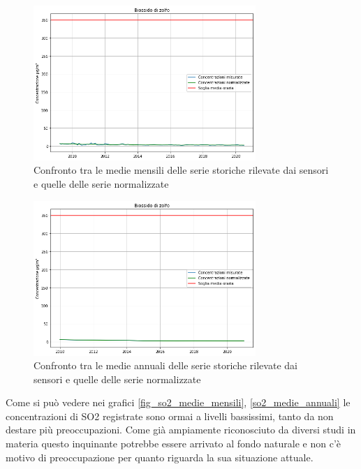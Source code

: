 \documentclass[a4paper]{report}
\begin{document}
\begin{figure}[h]
\centering
\includegraphics[width=0.75\textwidth]{so2_medie_mensili}
\caption{Confronto tra le medie mensili delle serie storiche rilevate dai sensori e quelle delle serie normalizzate}
\label{fig:so2_medie_mensili}
\end{figure}

\begin{figure}[h]
\centering
\includegraphics[width=0.75\textwidth]{so2_medie_annuali}
\caption{Confronto tra le medie annuali delle serie storiche rilevate dai sensori e quelle delle serie normalizzate}
\label{fig:so2_medie_annuali}
\end{figure}

Come si può vedere nei grafici \ref{fig_so2_medie_mensili}, \ref{so2_medie_annuali} le concentrazioni di SO2 registrate sono ormai a livelli bassissimi, tanto da non destare più preoccupazioni. Come già ampiamente riconosciuto da diversi studi in materia \cite{iir2020, scolari2017evoluzione}
 questo inquinante potrebbe essere arrivato al fondo naturale e non c'è motivo di preoccupazione per quanto riguarda la sua situazione attuale.
\end{document}
